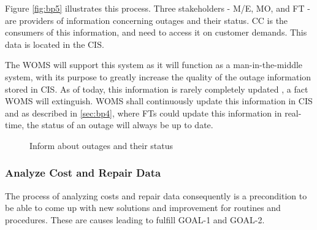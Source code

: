 Figure \ref{fig:bp5} illustrates this process. Three stakeholders - M/E, MO, and FT - are providers of information concerning outages and their status. CC is the consumers of this information, and need to access it on customer demands. This data is located in the CIS.

The WOMS will support this system as it will function as a man-in-the-middle system, with its purpose to greatly increase the quality of the outage information stored in CIS. As of today, this information is rarely completely updated \cite{appendixA}, a fact WOMS will extinguish. WOMS shall continuously update this information in CIS and as described in \ref{sec:bp4}, where FTs could update this information in real-time, the status of an outage will always be up to date. 
\begin{figure}[H]
	\centering
	\setlength\fboxsep{7pt}
	\setlength\fboxrule{0.5pt}
	\label{fig:inform}
	\caption{Inform about outages and their status}
\end{figure}
%
\subsubsection{Analyze Cost and Repair Data}
\label{bp6}
The process of analyzing costs and repair data consequently is a precondition to be able to come up with new solutions and improvement for routines and procedures. These are causes leading to fulfill GOAL-1 and GOAL-2. 

